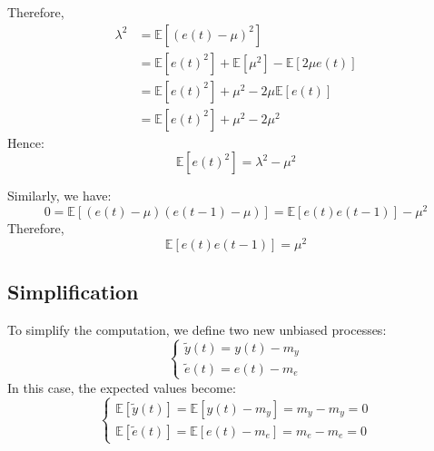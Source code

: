 Therefore,
\begin{align*}
    \lambda^2   &=\mathbb{E}\left[ {\left( e(t)-\mu \right)}^2 \right] \\
                &=\mathbb{E}\left[ {e(t)}^2\right] +\mathbb{E}\left[\mu^2\right]-\mathbb{E}\left[2\mu e(t)  \right] \\
                &=\mathbb{E}\left[ {e(t)}^2\right] +\mu^2-2\mu \mathbb{E}\left[e(t)  \right] \\   
                &=\mathbb{E}\left[ {e(t)}^2\right] +\mu^2-2\mu^2
\end{align*}
Hence: 
\[\mathbb{E}\left[{e(t)}^2\right]=\lambda^2-\mu^2\]

Similarly, we have:
\[0=\mathbb{E}\left[\left(e(t)-\mu\right)\left(e(t-1)-\mu\right)\right] =\mathbb{E}\left[e(t)e(t-1)\right] -\mu^2\]
Therefore,
\[\mathbb{E}\left[e(t)e(t-1)\right]=\mu^2\]

\subsection{Simplification}
To simplify the computation, we define two new unbiased processes:
\[\begin{cases}
    \tilde{y}(t)=y(t)-m_y \\ 
    \tilde{e}(t)=e(t)-m_e
\end{cases}\]
In this case, the expected values become:
\[\begin{cases}
    \mathbb{E}\left[\tilde{y}(t)\right]=\mathbb{E}\left[y(t)-m_y\right]=m_y-m_y=0 \\ 
    \mathbb{E}\left[\tilde{e}(t)\right]=\mathbb{E}\left[e(t)-m_e\right]=m_e-m_e=0
\end{cases}\]

